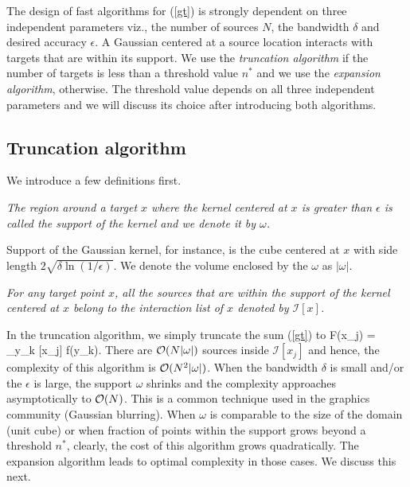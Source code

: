 
The design of fast algorithms for (\ref{gt}) is strongly dependent on three independent parameters viz., the number of sources $N$, the bandwidth $\delta$ and desired accuracy $\epsilon$. A Gaussian centered at a source location interacts with targets that are within its support. We use the {\em truncation algorithm} if the number of targets is less than a threshold value $n^*$ and we use the {\em expansion algorithm}, otherwise. The threshold value depends on all three independent parameters and we will discuss its choice after introducing both algorithms. 

\subsection{Truncation algorithm} 
We introduce a few definitions first.
\begin{mydef} {\em The region around a target $x$ where the kernel centered at $x$ is greater than $\epsilon$ is called the support of the kernel and we denote it by $\omega$.}
\end{mydef}

Support of the Gaussian kernel, for instance, is the cube centered at $x$ with side length $2 \sqrt{\delta \ln (1/\epsilon)}$. We denote the volume enclosed by the $\omega$ as $|\omega|$.

\begin{mydef} {\em For any target point $x$, all the sources that are within the support of the kernel centered at $x$ belong to the interaction list of $x$ denoted by $\mathcal{I}[x]$.}
\end{mydef}
In the truncation algorithm, we simply truncate the sum (\ref{gt}) to
%
\beq F(x_j) = \sum_{y_k \in {}[x_j]}  f(y_k). \label{eqn:truncation} \eeq
%
There are $\mathcal{O}(N |\omega|)$ sources inside $\mathcal{I}[x_j]$ and hence, the complexity of this algorithm is $\mathcal{O}(N^2 |\omega|)$. When the bandwidth $\delta$ is small and/or the $\epsilon$ is large, the support $\omega$ shrinks and the complexity approaches asymptotically to $\mathcal{O}(N)$. This is a common technique used in the graphics community (Gaussian blurring). When $\omega$ is comparable to the size of the domain (unit cube) or when fraction of points within the support grows beyond a threshold $n^*$, clearly, the cost of this algorithm grows quadratically. The expansion algorithm leads to optimal complexity in those cases. We discuss this next.


